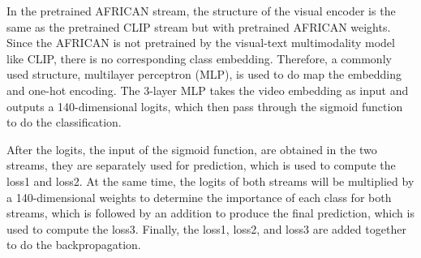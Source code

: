 In the pretrained AFRICAN stream, the structure of the visual encoder is the same as the pretrained CLIP stream but with pretrained AFRICAN weights. Since the AFRICAN is not pretrained by the visual-text multimodality model like CLIP, there is no corresponding class embedding. Therefore, a commonly used structure, multilayer perceptron (MLP), is used to do map the embedding and one-hot encoding. The 3-layer MLP takes the video embedding as input and outputs a 140-dimensional logits, which then pass through the sigmoid function to do the classification.

After the logits, the input of the sigmoid function, are obtained in the two streams, they are separately used for prediction, which is used to compute the loss1 and loss2. At the same time, the logits of both streams will be multiplied by a 140-dimensional weights to determine the importance of each class for both streams, which is followed by an addition to produce the final prediction, which is used to compute the loss3. Finally, the loss1, loss2, and loss3 are added together to do the backpropagation. 






